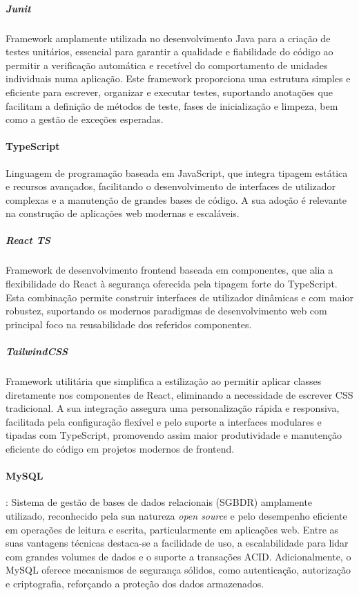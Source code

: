 \subparagraph{Junit} Framework amplamente utilizada no desenvolvimento Java para a criação de testes unitários, essencial para garantir a qualidade e fiabilidade do código ao permitir a verificação automática e recetível do comportamento de unidades individuais numa aplicação. Este framework proporciona uma estrutura simples e eficiente para escrever, organizar e executar testes, suportando anotações que facilitam a definição de métodos de teste, fases de inicialização e limpeza, bem como a gestão de exceções esperadas.

\paragraph{TypeScript} Linguagem de programação baseada em JavaScript, que integra tipagem estática e recursos avançados, facilitando o desenvolvimento de interfaces de utilizador complexas e a manutenção de grandes bases de código. A sua adoção é relevante na construção de aplicações web modernas e escaláveis.

\subparagraph{React TS} Framework de desenvolvimento frontend baseada em componentes, que alia a flexibilidade do React à segurança oferecida pela tipagem forte do TypeScript. Esta combinação permite construir interfaces de utilizador dinâmicas e com maior robustez, suportando os modernos paradigmas de desenvolvimento web com principal foco na reusabilidade dos referidos componentes.

\subparagraph{TailwindCSS} Framework utilitária que simplifica a estilização ao permitir aplicar classes diretamente nos componentes de React, eliminando a necessidade de escrever CSS tradicional. A sua integração assegura uma personalização rápida e responsiva, facilitada pela configuração flexível e pelo suporte a interfaces modulares e tipadas com TypeScript, promovendo assim maior produtividade e manutenção eficiente do código em projetos modernos de frontend.

\paragraph{MySQL}: Sistema de gestão de bases de dados relacionais (SGBDR) amplamente utilizado, reconhecido pela sua natureza \textit{open source} e pelo desempenho eficiente em operações de leitura e escrita, particularmente em aplicações web. Entre as suas vantagens técnicas destaca-se a facilidade de uso, a escalabilidade para lidar com grandes volumes de dados e o suporte a transações ACID. Adicionalmente, o MySQL oferece mecanismos de segurança sólidos, como autenticação, autorização e criptografia, reforçando a proteção dos dados armazenados.


